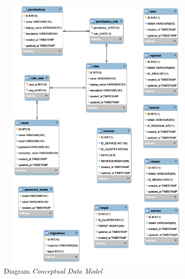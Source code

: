 	\begin{figure}[h!]
	\centerline
	{\includegraphics[width=10cm,height=14cm]{bab4/CDM.png}}
	\caption{Diagram \textit{Conceptual Data Model}}
	\label{figure:CDM}
	\end{figure}
	
